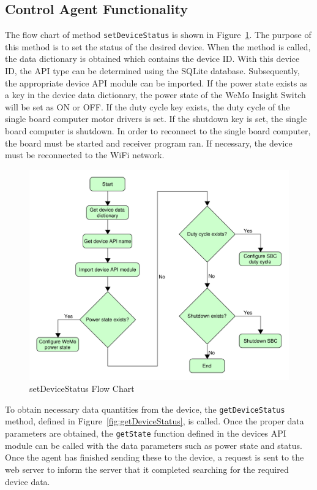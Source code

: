 \subsection{Control Agent Functionality}
The flow chart of method \texttt{setDeviceStatus} is shown in
Figure~\ref{fig:setDeviceStatus}. The purpose of this method is to set the
status of the desired device. When the method is called, the data dictionary is
obtained which contains the device ID. With this device ID, the API type can be
determined using the SQLite database. Subsequently, the appropriate device API
module can be imported. If the power state exists as a key in the device data
dictionary, the power state of the WeMo Insight Switch will be set as ON or OFF.
If the duty cycle key exists, the duty cycle of the single board computer motor
drivers is set. If the shutdown key is set, the single board computer is
shutdown. In order to reconnect to the single board computer, the board must be
started and receiver program ran. If necessary, the device must be reconnected
to the WiFi network. %
%
\begin{figure}
    \centering
    \includegraphics[scale=0.5]{figs/setDeviceStatus.pdf}
    \caption{setDeviceStatus Flow Chart}
    \label{fig:setDeviceStatus}
\end{figure}

To obtain necessary data quantities from the device, the
\texttt{getDeviceStatus} method, defined in Figure~\ref{fig:getDeviceStatus}, is called. Once the proper data parameters are
obtained, the \texttt{getState} function defined in the devices API module can
be called with the data parameters such as power state and
status. Once the agent has finished sending these to the device, a request is
sent to the web server to inform the server that it completed searching for the
required device data. %

